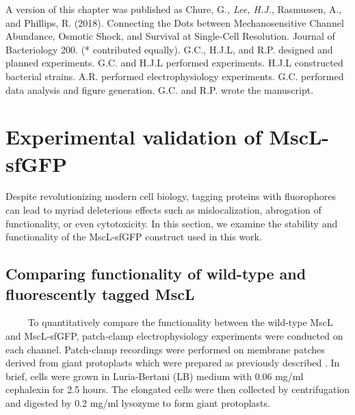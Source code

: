 \documentclass[12pt]{caltech_thesis}
\begin{document}
A version of this chapter was published as Chure, G.\emph{, Lee, H.J.},
Rasmussen, A., and Phillips, R. (2018). Connecting the Dots between
Mechanosensitive Channel Abundance, Osmotic Shock, and Survival at
Single-Cell Resolution. Journal of Bacteriology 200. (* contributed
equally). G.C., H.J.L, and R.P. designed and planned experiments. G.C.
and H.J.L performed experiments. H.J.L constructed bacterial strains.
A.R. performed electrophysiology experiments. G.C. performed data
analysis and figure generation. G.C. and R.P. wrote the manuscript.

\hypertarget{experimental-validation-of-mscl-sfgfp}{%
\section{Experimental validation of
MscL-sfGFP}\label{experimental-validation-of-mscl-sfgfp}}

Despite revolutionizing modern cell biology, tagging proteins with
fluorophores can lead to myriad deleterious effects such as
mislocalization, abrogation of functionality, or even cytotoxicity. In
this section, we examine the stability and functionality of the
MscL-sfGFP construct used in this work.

\hypertarget{comparing-functionality-of-wild-type-and-fluorescently-tagged-mscl}{%
\subsection{Comparing functionality of wild-type and fluorescently
tagged
MscL}\label{comparing-functionality-of-wild-type-and-fluorescently-tagged-mscl}}

~~~~ To quantitatively compare the functionality between the wild-type
MscL and MscL-sfGFP, patch-clamp electrophysiology experiments were
conducted on each channel. Patch-clamp recordings were performed on
membrane patches derived from giant protoplasts which were prepared as
previously described \autocite{blount1999}. In brief, cells were grown
in Luria-Bertani (LB) medium with 0.06 mg/ml cephalexin for 2.5 hours.
The elongated cells were then collected by centrifugation and digested
by 0.2 mg/ml lysozyme to form giant protoplasts.
\end{document}
